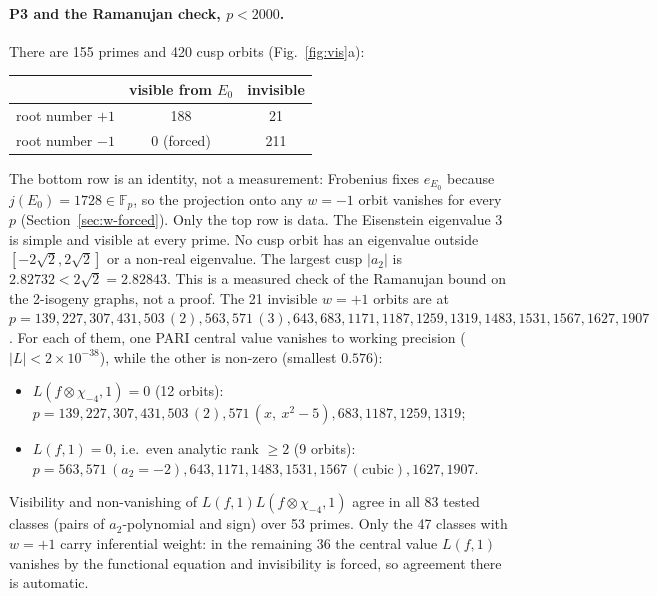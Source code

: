 \documentclass[11pt,a4paper]{article}
\theoremstyle{definition}
\begin{document}
\paragraph{P3 and the Ramanujan check, $p<2000$.} There are 155 primes and 420 cusp orbits (Fig.~\ref{fig:vis}a):
\begin{center}
\begin{tabular}{@{}lcc@{}}
\toprule
 & visible from $E_0$ & invisible \\
\midrule
root number $+1$ & 188 & 21 \\
root number $-1$ & 0 (forced) & 211 \\
\bottomrule
\end{tabular}
\end{center}
The bottom row is an identity, not a measurement: Frobenius fixes $e_{E_0}$ because $j(E_0)=1728\in\mathbb F_p$, so the projection onto any $w=-1$ orbit vanishes for every $p$ (Section~\ref{sec:w-forced}). Only the top row is data.
The Eisenstein eigenvalue $3$ is simple and visible at every prime. No cusp orbit has an eigenvalue outside $[-2\sqrt2,2\sqrt2]$ or a non-real eigenvalue. The largest cusp $|a_2|$ is $2.82732<2\sqrt2=2.82843$. This is a measured check of the Ramanujan bound on the 2-isogeny graphs, not a proof. The 21 invisible $w=+1$ orbits are at $p=139,227,307,431,503\,(2),563,571\,(3),643,683,1171,1187,1259,1319,1483,1531,1567,1627,1907$. For each of them, one PARI central value vanishes to working precision ($|L|<2\times10^{-38}$), while the other is non-zero (smallest $0.576$):
\begin{itemize}
  \item $L(f\otimes\chi_{-4},1)=0$ (12 orbits): $p=139,227,307,431,503\,(2),571\,(x,\ x^2-5),683,1187,1259,1319$;
  \item $L(f,1)=0$, i.e.\ even analytic rank $\ge2$ (9 orbits): $p=563,571\,(a_2=-2),643,1171,1483,1531,1567\,(\text{cubic}),1627,1907$.
\end{itemize}
Visibility and non-vanishing of $L(f,1)L(f\otimes\chi_{-4},1)$ agree in all 83 tested classes (pairs of $a_2$-polynomial and sign) over 53 primes. Only the 47 classes with $w=+1$ carry inferential weight: in the remaining 36 the central value $L(f,1)$ vanishes by the functional equation and invisibility is forced, so agreement there is automatic.
\end{document}
